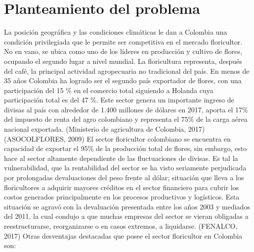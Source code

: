 

\minitoc

\section{Planteamiento del problema}
La posición geográfica y las condiciones climáticas le dan a Colombia una condición privilegiada que le permite ser competitiva en el mercado floricultor. No en vano, se ubica como uno de los líderes en producción y cultivo de flores, ocupando el segundo lugar a nivel mundial. La floricultura representa, después del café, la principal actividad agropecuaria no tradicional del país.
En menos de 35 años Colombia ha logrado ser el segundo país exportador de flores, con una participación del 15 \% en el comercio total siguiendo a Holanda cuya participación total es del 47 \%.  Este sector genera un importante ingreso de divisas al país con alrededor de 1.400 millones de dólares en 2017, aporta el 17\% del impuesto de renta del agro colombiano y representa el 75\% de la carga aérea nacional exportada. (Ministerio de agricultura de Colombia, 2017) (ASOCOLFLORES, 2009) 
El sector floricultor colombiano se encuentra en capacidad de exportar el 95\% de la producción total de flores, sin embargo, esto hace al sector altamente dependiente de las fluctuaciones de divisas. Es tal la vulnerabilidad, que la rentabilidad del sector se ha visto seriamente perjudicada por prolongadas devaluaciones del peso frente al dólar; situación que lleva a los floricultores a adquirir mayores créditos en el sector financiero para cubrir los costos generados principalmente en los procesos productivos y logísticos. Esta situación se agravó con la devaluación presentada entre los años 2003 y mediados del 2011, la cual condujo a que muchas empresas del sector se vieran obligadas a reestructurarse, reorganizarse o en casos extremos, a liquidarse. (FENALCO, 2017) 
Otras desventajas destacadas que posee el sector floricultor en Colombia son:
